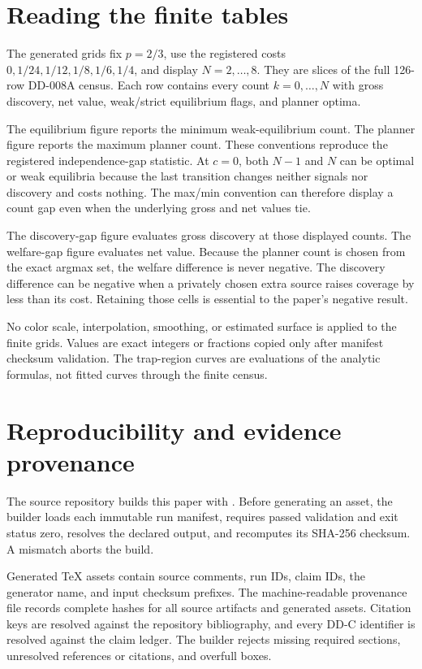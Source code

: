\documentclass[11pt]{article}
\begin{document}
\section{Reading the finite tables}

The generated grids fix $p=2/3$, use the registered costs
$0,1/24,1/12,1/8,1/6,1/4$, and display $N=2,\ldots,8$. They are slices of the
full 126-row DD-008A census. Each row contains every count $k=0,\ldots,N$ with
gross discovery, net value, weak/strict equilibrium flags, and planner optima.

The equilibrium figure reports the minimum weak-equilibrium count. The planner
figure reports the maximum planner count. These conventions reproduce the
registered independence-gap statistic. At $c=0$, both $N-1$ and $N$ can be
optimal or weak equilibria because the last transition changes neither signals
nor discovery and costs nothing. The max/min convention can therefore display
a count gap even when the underlying gross and net values tie.

The discovery-gap figure evaluates gross discovery at those displayed counts.
The welfare-gap figure evaluates net value. Because the planner count is chosen
from the exact argmax set, the welfare difference is never negative. The
discovery difference can be negative when a privately chosen extra source raises
coverage by less than its cost. Retaining those cells is essential to the
paper's negative result.

No color scale, interpolation, smoothing, or estimated surface is applied to the
finite grids. Values are exact integers or fractions copied only after manifest
checksum validation. The trap-region curves are evaluations of the analytic
formulas, not fitted curves through the finite census.

\section{Reproducibility and evidence provenance}

The source repository builds this paper with
. Before generating
an asset, the builder loads each immutable run manifest, requires passed
validation and exit status zero, resolves the declared output, and recomputes its
SHA-256 checksum. A mismatch aborts the build.

Generated TeX assets contain source comments, run IDs, claim IDs, the generator
name, and input checksum prefixes. The machine-readable provenance file records
complete hashes for all source artifacts and generated assets. Citation keys are
resolved against the repository bibliography, and every DD-C identifier is
resolved against the claim ledger. The builder rejects missing required sections,
unresolved references or citations, and overfull boxes.
\end{document}
